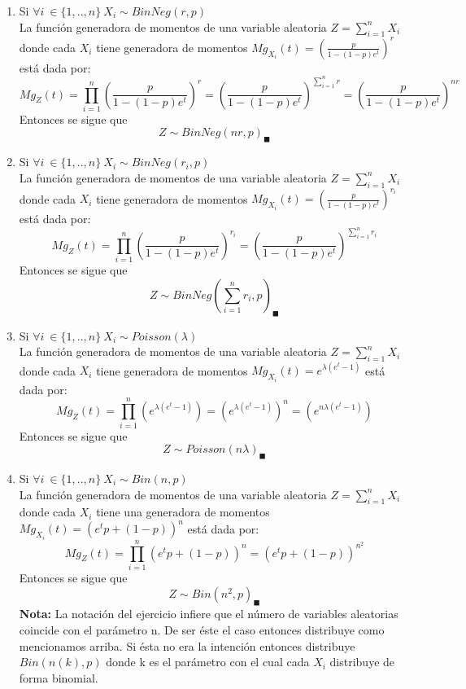 \documentclass[11pt,a4paper]{report}
\begin{document}
\begin{enumerate}
{\begin{enumerate}
                $$Z\sim BinNeg(n,p)_{\blacksquare}$$
                \item{Si $\forall i \ \in \lbrace 1,..,n \rbrace \ X_{i} \sim BinNeg(r,p)$ }\\
                La función generadora de momentos de una variable aleatoria $Z=\sum_{i=1}^{n}X_{i}$ donde cada $X_{i}$ tiene generadora de momentos $Mg_{X_{i}}(t)=(\frac{p}{1-(1-p)e^t})^r$ está dada por:
                $$Mg_{Z}(t)=\prod_{i=1}^{n}(\frac{p}{1-(1-p)e^t})^r=(\frac{p}{1-(1-p)e^t})^{\sum_{i=1}^{n}r}=(\frac{p}{1-(1-p)e^t})^{nr}$$
                Entonces se sigue que 
                $$Z \sim BinNeg(nr,p)_{\blacksquare}$$
                \item{Si $\forall i \ \in \lbrace 1,..,n \rbrace \ X_{i} \sim BinNeg(r_{i},p)$ }\\
                La función generadora de momentos de una variable aleatoria $Z=\sum_{i=1}^{n}X_{i}$ donde cada $X_{i}$ tiene generadora de momentos $Mg_{X_{i}}(t)=(\frac{p}{1-(1-p)e^t})^{r_{i}}$ está dada por:
                $$Mg_{Z}(t)=\prod_{i=1}^{n}(\frac{p}{1-(1-p)e^t})^{r_{i}}=(\frac{p}{1-(1-p)e^t})^{\sum_{i=1}^{n}r_{i}}$$ Entonces se sigue que 
                $$Z\sim BinNeg(\sum_{i=1}^{n}r_{i},p)_{\blacksquare}$$
                \item{Si $\forall i \ \in \lbrace 1,..,n \rbrace \ X_{i} \sim Poisson(\lambda)$ }\\
                La función generadora de momentos de una variable aleatoria $Z=\sum_{i=1}^{n}X_{i}$ donde cada $X_{i}$ tiene generadora de momentos $Mg_{X_{i}}(t)=e^{\lambda(e^t-1)}$ está dada por:
                $$Mg_{Z}(t)=\prod_{i=1}^{n}(e^{\lambda(e^t-1)})=(e^{\lambda(e^t-1)})^n=(e^{n\lambda (e^t-1)})$$
                Entonces se sigue que 
                $$Z\sim Poisson(n\lambda)_{\blacksquare}$$
                
                \item{Si $\forall i \ \in \lbrace 1,..,n \rbrace \ X_{i} \sim Bin(n,p)$}\\
                La función generadora de momentos de una variable aleatoria $Z=\sum_{i=1}^{n}X_{i}$ donde cada $X_{i}$ tiene una generadora de momentos $Mg_{X_{i}}(t)=(e^t p+(1-p))^n$ está dada por:
                $$Mg_{Z}(t)=\prod_{i=1}^n (e^t p+(1-p))^n=(e^t p+(1-p))^{n^2}$$
                Entonces se sigue que 
                $$Z \sim Bin(n^2,p)_{\blacksquare}$$
                \textbf{Nota:} La notación del ejercicio infiere que el número de variables aleatorias coincide con el parámetro n. De ser éste el caso entonces distribuye como mencionamos arriba. Si ésta no era la intención entonces distribuye $Bin(n(k),p)$ donde k es el parámetro con el cual cada $X_{i}$ distribuye de forma binomial.
        

\end{enumerate}}
\end{enumerate}
\end{document}
